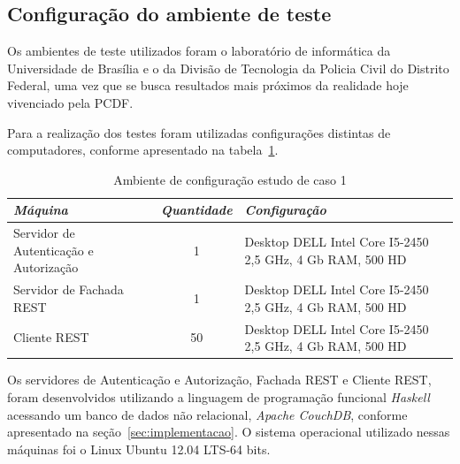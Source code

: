 \subsection{Configuração do ambiente de teste}

Os ambientes de teste utilizados foram o laboratório de informática da Universidade de Brasília e o da Divisão de Tecnologia da Policia Civil do Distrito Federal, uma vez que se busca resultados mais próximos da realidade hoje vivenciado pela PCDF.

Para a realização dos testes foram utilizadas configurações distintas de computadores, conforme apresentado na tabela~\ref{tb:estudo_caso1}.
%
\begin{table}[h]
    \begin{tabular}{|l|c|p{6cm}|}
    \hline
    \textbf{\emph{Máquina }}                   & \textbf{\emph{Quantidade}} & \textbf{\emph{Configuração}}                                                                               \\ \hline
    Servidor de Autenticação e Autorização  & 1          & Desktop DELL Intel Core I5-2450 2,5 GHz, 4 Gb RAM, 500 HD \\ \hline
    Servidor de Fachada REST  & 1          & Desktop DELL Intel Core I5-2450 2,5 GHz, 4 Gb RAM, 500 HD\\ \hline
    Cliente REST                   & 50        & Desktop DELL Intel Core I5-2450 2,5 GHz, 4 Gb RAM, 500 HD                                    \\ \hline
    \end{tabular}
    \caption {Ambiente de configuração estudo de caso 1}\label{tb:estudo_caso1}
\end{table}

Os servidores de Autenticação e Autorização, Fachada REST e Cliente REST, foram desenvolvidos utilizando a linguagem de programação funcional \emph{Haskell} acessando um banco de dados não relacional, \emph{Apache CouchDB}, conforme apresentado na seção~\ref{sec:implementacao}. O sistema operacional utilizado nessas máquinas foi o Linux Ubuntu 12.04 LTS-64 bits.



